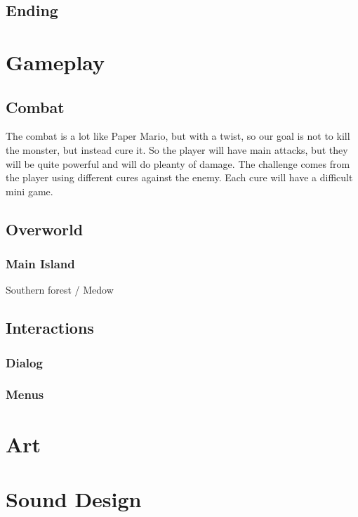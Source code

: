 \documentclass{article}
\begin{document}
\subsection{Ending} 

\section{Gameplay} 

\subsection{Combat} 
The combat is a lot like Paper Mario, but with a twist, so our goal is not to kill the monster, but instead cure it. So the player will have main attacks, but they will be quite powerful and will do pleanty of damage. The challenge comes from the player using different cures against the enemy. Each cure will have a difficult mini game.

\subsection{Overworld}

\subsubsection{Main Island}
Southern forest / Medow

\subsection{Interactions}
\subsubsection{Dialog}
\subsubsection{Menus} 

\section{Art}

\section{Sound Design}
\end{document}
